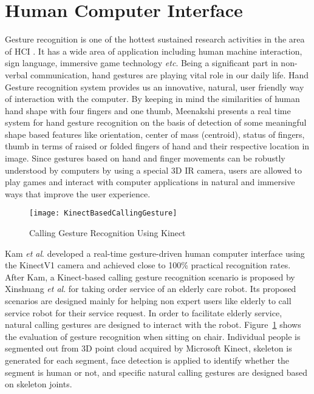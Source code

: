 \section{Human Computer Interface}
\indent
Gesture recognition is one of the hottest sustained research activities in the area of HCI \cite{NIRGesture14}. It has a wide area of application including human machine interaction, sign language, immersive game technology \textit{etc}. Being a significant part in non-verbal communication, hand gestures are playing vital role in our daily life. Hand Gesture recognition system provides us an innovative, natural, user friendly way of interaction with the computer. By keeping in mind the similarities of human hand shape with four fingers and one thumb, Meenakshi \cite{gestureRecognition12} presents a real time system for hand gesture recognition on the basis of detection of some meaningful shape based features like orientation, center of mass (centroid), status of fingers, thumb in terms of raised or folded fingers of hand and their respective location in image. Since gestures based on hand and finger movements can be robustly understood by computers by using a special 3D IR camera, users are allowed to play games and interact with computer applications in natural and immersive ways that improve the user experience. 
\\\indent
\begin{figure}[t]
\centering
\texttt{[image: KinectBasedCallingGesture]}
\caption{Calling Gesture Recognition Using Kinect \cite{gestureKinect14}}
\label{KinectBasedCallingGesture}
\end{figure}%
%
Kam \textit{et al}. \cite{KinectGesture12} developed a real-time gesture-driven human computer interface using the KinectV1 camera and achieved close to 100\% practical recognition rates. After Kam, a Kinect-based calling gesture recognition scenario is proposed by Xinshuang  \textit{et al}. \cite{gestureKinect14} for taking order service of an elderly care robot. Its proposed scenarios are designed mainly for helping non expert users like elderly to call service robot for their service request. In order to facilitate elderly service, natural calling gestures are designed to interact with the robot. Figure~\ref{KinectBasedCallingGesture} shows the evaluation of gesture recognition when sitting on chair. Individual people is segmented out from 3D point cloud acquired by Microsoft Kinect, skeleton is generated for each segment, face detection is applied to identify whether the segment is human or not, and specific natural calling gestures are designed based on skeleton joints. %
